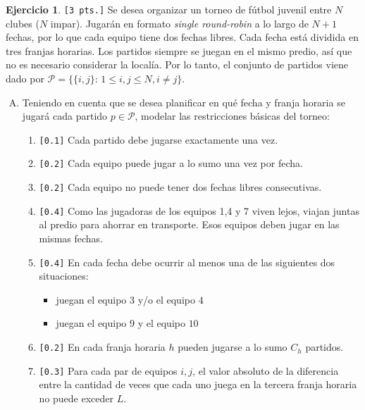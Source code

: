 \documentclass[a4paper,oneside,12pt]{amsart}
\theoremstyle{definition}
\newtheorem{quest}{Ejercicio}
\begin{document}
\begin{quest} 

\verb|[3 pts.]| Se desea organizar un torneo de fútbol juvenil entre $N$ clubes ($N$ impar). Jugarán en formato \textit{single round-robin} a lo largo de $N+1$ fechas, por lo que cada equipo tiene dos fechas libres. Cada fecha está dividida en tres franjas horarias. Los partidos siempre se juegan en el mismo predio, así que no es necesario considerar la localía. Por lo tanto, el conjunto de partidos viene dado por $\mathcal{P}=\{\{i,j\}\colon\, 1\leq i,j\leq N, i\neq j \}$. 

\begin{enumerate}[A)]
    \item Teniendo en cuenta que se desea planificar en qué fecha y franja horaria se jugará cada partido $p\in\mathcal{P}$, modelar las restricciones básicas del torneo:
        \begin{enumerate}[1.]
            \item \verb|[0.1]| Cada partido debe jugarse exactamente una vez.
            \item \verb|[0.2]| Cada equipo puede jugar a lo sumo una vez por fecha.
            \item \verb|[0.2]| Cada equipo no puede tener dos fechas libres consecutivas.
            \item \verb|[0.4]| Como las jugadoras de los equipos 1,4 y 7 viven lejos, viajan juntas al predio para ahorrar en transporte. Esos equipos deben jugar en las mismas fechas.
            \item \verb|[0.4]| En cada fecha debe ocurrir al menos una de las siguientes dos situaciones:
            \begin{itemize}
                \item juegan el equipo $3$ y/o el equipo $4$
                \item juegan el equipo $9$ y el equipo $10$
            \end{itemize}
            \item \verb|[0.2]| En cada franja horaria $h$ pueden jugarse a lo sumo $C_h$ partidos.
            \item \verb|[0.3]| Para cada par de equipos $i,j$, el valor absoluto de la diferencia entre la cantidad de veces que cada uno juega en la tercera franja horaria no puede exceder $L$.
        \end{enumerate}

\end{enumerate}
\end{quest}
\end{document}
